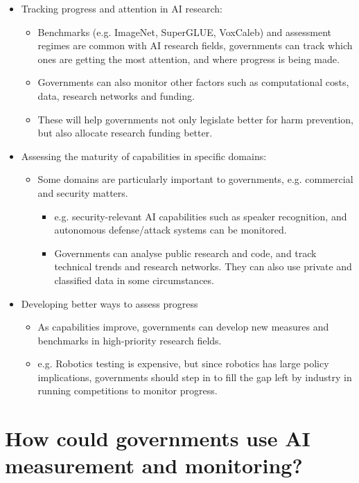 \documentclass{article}
\begin{document}
\begin{multicols}{2}
\begin{itemize}
\item Tracking progress and attention in AI research:
    \begin{itemize}
    \item Benchmarks (e.g. ImageNet, SuperGLUE, VoxCaleb) and assessment regimes are common with AI research fields, governments can track which ones are getting the most attention, and where progress is being made.
    \item Governments can also monitor other factors such as computational costs, data, research networks and funding.
    \item These will help governments not only legislate better for harm prevention, but also allocate research funding better.
    \end{itemize}
\item Assessing the maturity of capabilities in specific domains:
    \begin{itemize}
    \item Some domains are particularly important to governments, e.g. commercial and security matters.
        \begin{itemize}
        \item e.g. security-relevant AI capabilities such as speaker recognition, and autonomous defense/attack systems can be monitored.
        \item Governments can analyse public research and code, and track technical trends and research networks. They can also use private and classified data in some circumstances.
        \end{itemize}
    \end{itemize}
\item Developing better ways to assess progress
    \begin{itemize}
    \item As capabilities improve, governments can develop new measures and benchmarks in high-priority research fields.
    \item e.g. Robotics testing is expensive, but since robotics has large policy implications, governments should step in to fill the gap left by industry in running competitions to monitor progress.
    \end{itemize}
\end{itemize}

\section{How could governments use AI measurement and monitoring?}


\end{multicols}
\end{document}
